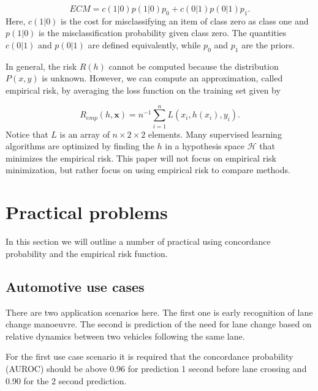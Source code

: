 \documentclass{article}
\theoremstyle{theorem}
\theoremstyle{definition}
\newcommand{\bv}[1]{\bm{#1}}
\begin{document}
\begin{equation}
\label{eq:ecm}
ECM =  c(1|0)p(1|0)p_0  + c(0|1)p(0|1)p_1.
\end{equation}
Here, $c(1|0)$ is the cost for misclassifying an item of class zero as class one and $p(1|0)$ is the misclassification probability given class zero.  The quantities $c(0|1)$ and $p(0|1)$ are defined equivalently, while $p_0$ and $p_1$ are the priors.  

In general, the risk $R(h)$ cannot be computed because the distribution $P(x, y)$ is unknown.  However, we can compute an approximation, called empirical risk, by averaging the loss function on the training set given by 

\begin{equation}
\label{def:empRisk}
R_{emp}(h, \bv{x}) = n^{-1} \sum_{i=1}^n L(x_i, h(x_i), y_i).
\end{equation}
Notice that $L$ is an array of $n \times 2\times 2$ elements.  Many supervised learning algorithms are optimized by finding the $h$ in a hypothesis space $\mathcal{H}$ that minimizes the empirical risk.  This paper will not focus on empirical risk minimization, but rather focus on using empirical risk to compare methods.
%



\section{Practical problems}
\label{sec:practicalEmpRisk}

In this section we will outline a number of practical using concordance probability and the empirical risk function.


\subsection{Automotive use cases }
\label{sec:automotive}

There are two application scenarios here.  The first one is early recognition of lane change manoeuvre. The second is prediction of the need for lane change based on relative dynamics between two vehicles following the same lane.

For the first use case scenario it is required that the concordance probability (AUROC) should be above 0.96 for prediction 1 second before lane crossing and 0.90 for the 2 second prediction.
\end{document}
